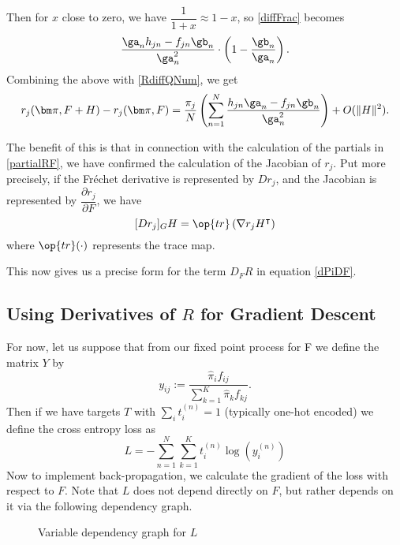 Then for $x$ close to zero, we have $\dfrac{1}{1+x}\approx 1-x$, so \ref{diffFrac} becomes
\[\frac{\ga_nh_{jn}-f_{jn}\gb_n}{\ga_n^2}\cdot\left(1-\frac{\gb_n}{\ga_n}\right).\]
Combining the above with \ref{RdiffQNum}, we get
\begin{equation}\label{derFrechR}
r_j(\bm\pi,F+H)-r_j(\bm\pi, F)=\frac{\pi_j}{N}\left(\sum\limits_{n=1}^N \frac{h_{jn}\ga_n-f_{jn}\gb_n}{\ga_n^2}\right) +O(\|H\|^2).
\end{equation}

The benefit of this is that in connection with the calculation of the partials in \ref{partialRF}, we have confirmed the calculation of the Jacobian of $r_j$.  Put more precisely, if the Fr\'{e}chet derivative is represented by $Dr_j$, and the Jacobian is represented by $\dfrac{\partial r_j}{\partial F}$, we have
\[[Dr_j]_GH=\op{tr}\left(\nabla r_jH^{\intercal}\right)\]%
where $\op{tr}(\cdot)$ represents the trace map.

This now gives us a precise form for the term $\displaystyle D_FR$ in equation \ref{dPiDF}.



\subsection{Using Derivatives of $R$ for Gradient Descent}
For now, let us suppose that from our fixed point process for \Rpi F we define the matrix $Y$ by 
\[y_{ij}:=\frac{\hat{\pi}_if_{ij}}{\sum_{k=1}^{K}\hat{\pi}_kf_{kj}}.\]
Then if we have targets $T$ with $\sum_i t_i^{(n)}=1$ (typically one-hot encoded) we define the cross entropy loss as 
\begin{equation}\label{crossLoss}
L=-\sum_{n=1}^N\sum_{k=1}^{K}t_i^{(n)}\log(y_i^{(n)})
\end{equation}
Now to implement back-propagation, we calculate the gradient of the loss with respect to $F$.
Note that $L$ does not depend directly on $F$, but rather depends on it via the following dependency graph.

\begin{figure}[h]
\caption{Variable dependency graph for $L$}\label{LossDepGraph}
\end{figure}

